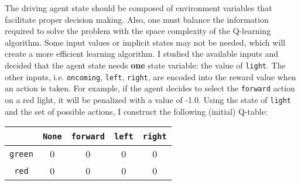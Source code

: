 \documentclass[12pt,letterpaper]{article}
\renewenvironment{itemize}{
  \begin{list}{}{
    \setlength{\leftmargin}{1.5em}
  }
}{
  \end{list}
}
\begin{document}
The driving agent state should be composed of environment variables that facilitate proper decision making.
Also, one must balance the information required to solve the problem with the space complexity of the Q-learning algorithm.
Some input values or implicit states may not be needed, which will create a more efficient learning algorithm.
I studied the available inputs and decided that the agent state needs \textbf{one} state variable: the value of \verb|light|.
The other inputs, i.e. \verb|oncoming|, \verb|left|, \verb|right|, are encoded into the reward value when an action is taken.
For example, if the agent decides to select the \verb|forward| action on a red light, it will be penalized with a value of -1.0.
Using the state of \verb|light| and the set of possible actions, I construct the following (initial) Q-table:
\begin{center}
    \begin{tabular}{| c | c | c | c | c |}
    \hline
    \ & \verb|None| & \verb|forward| & \verb|left| & \verb|right| \\ \hline
    \verb|green| & 0 & 0 & 0 & 0 \\ \hline
    \verb|red| & 0 & 0 & 0 & 0 \\ \hline
    \end{tabular}
\end{center}

\end{document}
